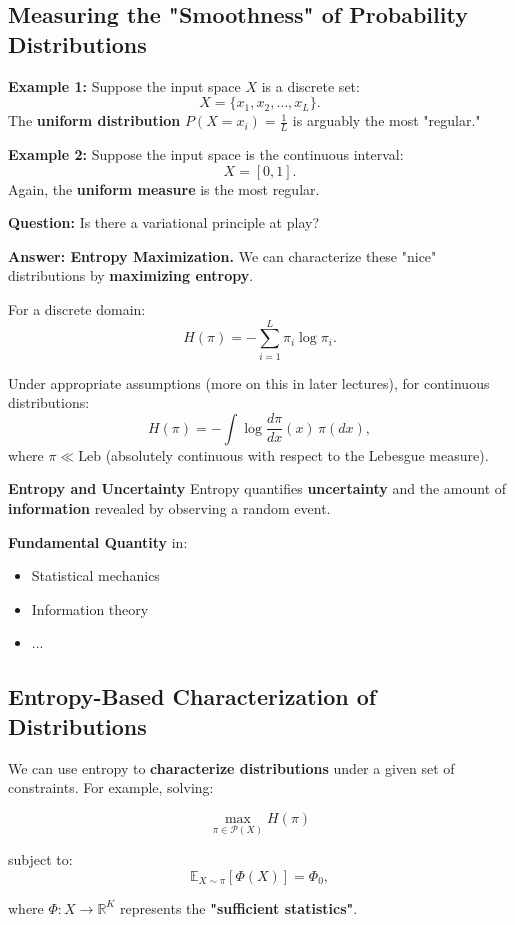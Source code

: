 \documentclass{article}
\begin{document}
\subsection{Measuring the "Smoothness" of Probability Distributions}

\textbf{Example 1:} Suppose the input space \( X \) is a discrete set:
\[
X = \{x_1, x_2, \dots, x_L\}.
\]
The \textbf{uniform distribution} \( P(X = x_i) = \frac{1}{L} \) is arguably the most "regular."

\textbf{Example 2:} Suppose the input space is the continuous interval:
\[
X = [0,1].
\]
Again, the \textbf{uniform measure} is the most regular.

\textbf{Question:} Is there a variational principle at play?

\textbf{Answer: Entropy Maximization.} We can characterize these "nice" distributions by \textbf{maximizing entropy}.

For a discrete domain:
\[
H(\pi) = - \sum_{i=1}^{L} \pi_i \log \pi_i.
\]

Under appropriate assumptions (more on this in later lectures), for continuous distributions:
\[
H(\pi) = - \int \log \frac{d\pi}{dx}(x) \, \pi(dx),
\]
where \( \pi \ll \text{Leb} \) (absolutely continuous with respect to the Lebesgue measure).

\textbf{Entropy and Uncertainty} Entropy quantifies \textbf{uncertainty} and the amount of \textbf{information} revealed by observing a random event.

\textbf{Fundamental Quantity} in:
\begin{itemize}
    \item Statistical mechanics
    \item Information theory
    \item ...
\end{itemize}

\subsection{Entropy-Based Characterization of Distributions}

We can use entropy to \textbf{characterize distributions} under a given set of constraints. For example, solving:

\[
\max_{\pi \in \mathcal{P}(X)} H(\pi)
\]

subject to:
\[
\mathbb{E}_{X \sim \pi} [\Phi(X)] = \Phi_0,
\]

where \( \Phi: X \to \mathbb{R}^K \) represents the \textbf{"sufficient statistics"}.
\end{document}
